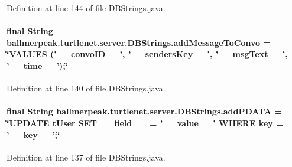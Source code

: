Definition at line 144 of file D\-B\-Strings.\-java.

\hypertarget{classballmerpeak_1_1turtlenet_1_1server_1_1DBStrings_a45dac2349c3f3f754513df6f87cc3b50}{
\paragraph[{add\-Message\-To\-Convo}]{\setlength{\rightskip}{0pt plus 5cm}final String ballmerpeak.\-turtlenet.\-server.\-D\-B\-Strings.\-add\-Message\-To\-Convo = \char`\"{}V\-A\-L\-U\-E\-S ('\-\_\-\-\_\-convo\-I\-D\-\_\-\-\_\-', '\-\_\-\-\_\-senders\-Key\-\_\-\-\_\-', '\-\_\-\-\_\-msg\-Text\-\_\-\-\_\-', '\-\_\-\-\_\-time\-\_\-\-\_\-');\char`\"{}\hspace{0.3cm}{\ttfamily [static]}}}\label{classballmerpeak_1_1turtlenet_1_1server_1_1DBStrings_a45dac2349c3f3f754513df6f87cc3b50}


Definition at line 140 of file D\-B\-Strings.\-java.

\hypertarget{classballmerpeak_1_1turtlenet_1_1server_1_1DBStrings_aac23d2b9eecb5d6088f8bb5058370c7b}{
\paragraph[{add\-P\-D\-A\-T\-A}]{\setlength{\rightskip}{0pt plus 5cm}final String ballmerpeak.\-turtlenet.\-server.\-D\-B\-Strings.\-add\-P\-D\-A\-T\-A = \char`\"{}U\-P\-D\-A\-T\-E t\-User S\-E\-T \-\_\-\-\_\-field\-\_\-\-\_\- = '\-\_\-\-\_\-value\-\_\-\-\_\-' W\-H\-E\-R\-E key = '\-\_\-\-\_\-key\-\_\-\-\_\-';\char`\"{}\hspace{0.3cm}{\ttfamily [static]}}}\label{classballmerpeak_1_1turtlenet_1_1server_1_1DBStrings_aac23d2b9eecb5d6088f8bb5058370c7b}


Definition at line 137 of file D\-B\-Strings.\-java.

